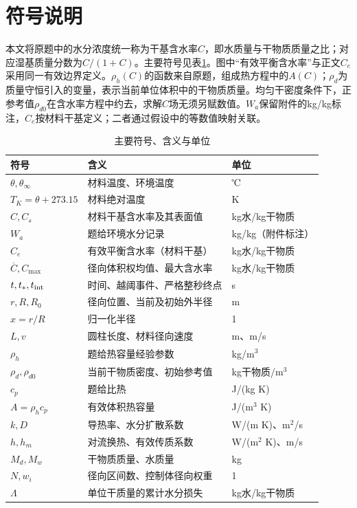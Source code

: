 \section{符号说明}\label{sec:symbols}
本文将原题中的水分浓度统一称为干基含水率$C$，即水质量与干物质质量之比；对应湿基质量分数为$C/(1+C)$。主要符号见表\ref{tab:symbol}。图中“有效平衡含水率”与正文$C_e$采用同一有效边界定义。$\rho_h(C)$的函数来自原题，组成热方程中的$A(C)$；$\rho_d$为质量守恒引入的变量，表示当前单位体积中的干物质质量。均匀干密度条件下，正参考值$\rho_{d0}$在含水率方程中约去，求解$C$场无须另赋数值。$W_a$保留附件的kg/kg标注，$C_e$按材料干基定义；二者通过假设中的等数值映射关联。

\begin{table}[htbp]\centering\small
\caption{主要符号、含义与单位}\label{tab:symbol}
\begin{tabular}{lll}
\toprule
符号 & 含义 & 单位\\
\midrule
$\theta,\theta_\infty$ & 材料温度、环境温度 & ℃\\
$T_K=\theta+273.15$ & 材料绝对温度 & K\\
$C,C_s$ & 材料干基含水率及其表面值 & kg水/kg干物质\\
$W_a$ & 题给环境水分记录 & kg/kg（附件标注）\\
$C_e$ & 有效平衡含水率（材料干基） & kg水/kg干物质\\
$\overline C,C_{\max}$ & 径向体积权均值、最大含水率 & kg水/kg干物质\\
$t,t_*,t_{\rm int}$ & 时间、越阈事件、严格整秒终点 & s\\
$r,R,R_0$ & 径向位置、当前及初始外半径 & m\\
$x=r/R$ & 归一化半径 & 1\\
$L,v$ & 圆柱长度、材料径向速度 & m、m/s\\
$\rho_h$ & 题给热容量经验参数 & kg/m$^3$\\
$\rho_d,\rho_{d0}$ & 当前干物质密度、初始参考值 & kg干物质/m$^3$\\
$c_p$ & 题给比热 & J/(kg K)\\
$A=\rho_h c_p$ & 有效体积热容量 & J/(m$^3$ K)\\
$k,D$ & 导热率、水分扩散系数 & W/(m K)、m$^2$/s\\
$h,h_m$ & 对流换热、有效传质系数 & W/(m$^2$ K)、m/s\\
$M_d,M_w$ & 干物质质量、水质量 & kg\\
$N,w_i$ & 径向区间数、控制体径向权重 & 1\\
$\Lambda$ & 单位干质量的累计水分损失 & kg水/kg干物质\\
\bottomrule
\end{tabular}
\end{table}
